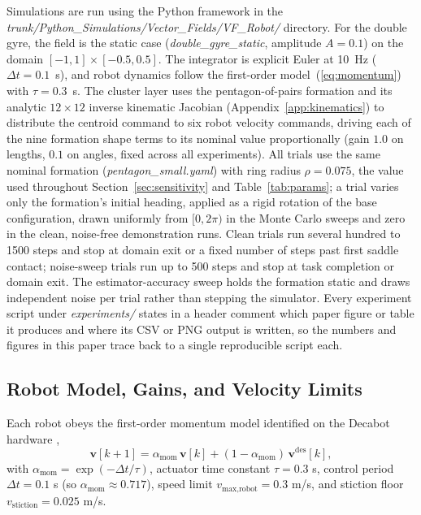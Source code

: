 \documentclass[lettersize,journal]{IEEEtran}
\begin{document}
Simulations are run using the Python framework in the
\textit{trunk/Python\_Simulations/Vector\_Fields/VF\_Robot/} directory.
For the double gyre, the field is the static case
(\textit{double\_gyre\_static}, amplitude $A = 0.1$) on the domain
$[-1, 1] \times [-0.5, 0.5]$. The integrator is explicit Euler at
10~Hz ($\Delta t = 0.1$~s), and robot dynamics follow the first-order
model~(\ref{eq:momentum}) with $\tau = 0.3$~s. The cluster layer uses
the pentagon-of-pairs formation and its analytic $12 \times 12$ inverse
kinematic Jacobian (Appendix~\ref{app:kinematics}) to distribute the
centroid command to six robot velocity commands, driving each of the
nine formation shape terms to its nominal value proportionally (gain
$1.0$ on lengths, $0.1$ on angles, fixed across all experiments). All
trials use the same nominal formation (\textit{pentagon\_small.yaml})
with ring radius $\rho = 0.075$, the value used throughout
Section~\ref{sec:sensitivity} and Table~\ref{tab:params}; a trial
varies only the formation's initial heading, applied as a rigid
rotation of the base configuration, drawn uniformly from $[0, 2\pi)$ in
the Monte Carlo sweeps and zero in the clean, noise-free demonstration
runs. Clean trials run several hundred to 1500 steps and stop at domain
exit or a fixed number of steps past first saddle contact; noise-sweep
trials run up to 500 steps and stop at task completion or domain exit.
The estimator-accuracy sweep holds the formation static and draws
independent noise per trial rather than stepping the simulator. Every
experiment script under \textit{experiments/} states in a header
comment which paper figure or table it produces and where its CSV or
PNG output is written, so the numbers and figures in this paper trace
back to a single reproducible script each.

\subsection{Robot Model, Gains, and Velocity Limits}
\label{sec:robot_model}

Each robot obeys the first-order momentum model identified on the
Decabot hardware \cite{14},
\begin{equation}
    \mathbf{v}[k+1] = \alpha_{\text{mom}}\,\mathbf{v}[k]
    + (1 - \alpha_{\text{mom}})\,\mathbf{v}^{\text{des}}[k],
    \label{eq:momentum}
\end{equation}
with $\alpha_{\text{mom}} = \exp(-\Delta t/\tau)$, actuator time
constant $\tau = 0.3$ s, control period $\Delta t = 0.1$ s (so
$\alpha_{\text{mom}} \approx 0.717$), speed limit
$v_{\text{max,robot}} = 0.3$ m/s, and stiction floor
$v_{\text{stiction}} = 0.025$ m/s.
\end{document}
